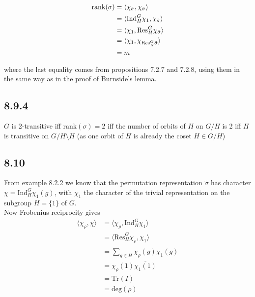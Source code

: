 \documentclass[12pt]{article}
\begin{document}
\begin{align*}
    \mathrm{rank}(\sigma) &= \langle \chi_{\Tilde{\sigma}}, \chi_{\Tilde{\sigma}} \rangle \\
    &= \langle \mathrm{Ind}^G_H \chi_1, \chi_{\Tilde{\sigma}} \rangle \\
    &= \langle \chi_1, \mathrm{Res}^G_H \chi_{\Tilde{\sigma}} \rangle \\
    &= \langle \chi_1, \chi_{\mathrm{Res}^G_H  \Tilde{\sigma}} \rangle \\
    &= m
\end{align*}

\noindent
where the last equality comes from propositions 7.2.7 and 7.2.8, using them in the same way as in the proof of Burnside's lemma.

\subsection*{8.9.4}

$G$ is 2-transitive iff $\mathrm{rank}(\sigma) = 2$ iff the number of orbits of $H$ on $G/H$ is 2 iff $H$ is transitive on $G/H \setminus H$ (as one orbit of $H$ is already the coset $H \in G/H$)

\subsection*{8.10}

From example 8.2.2 we know that the permutation representation $\widetilde{\sigma}$ has character $\chi = \mathrm{Ind}_H^G \chi_1 (g)$, with $\chi_1$ the character of the trivial representation on the subgroup $H=\{1\}$ of $G$.\\
Now Frobenius reciprocity gives
\begin{align*}
    \langle \chi_\rho, \chi \rangle &= \langle \chi_\rho, \mathrm{Ind}_H^G \chi_1 \rangle \\
    &= \langle \mathrm{Res}_H^G \chi_\rho, \chi_1 \rangle \\
    &= \sum_{g \in H} \chi_\rho (g) \overline{\chi_1 (g)} \\
    &= \chi_\rho (1) \overline{\chi_1 (1)} \\
    &= \mathrm{Tr}(I) \\
    &= \mathrm{deg}(\rho)
\end{align*}
\end{document}
